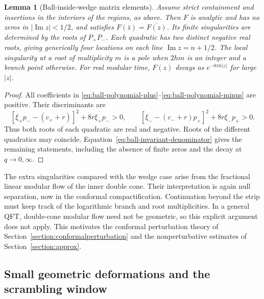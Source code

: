 \documentclass[a4paper,11pt]{article}
\newtheorem{lemma}[theorem]{Lemma}
\theoremstyle{definition}
\begin{document}
\begin{lemma}[Ball-inside-wedge matrix elements]
\label{lem:ball-matrix-element}
Assume strict containment and insertions in the interiors of the regions, as above. Then $F$ is analytic and has no zeros in $|\operatorname{Im}z|<1/2$, and satisfies $F(\bar z)=\overline{F(z)}$. Its finite singularities are determined by the roots of $P_+P_-$. Each quadratic has two distinct negative real roots, giving generically four locations on each line $\operatorname{Im}z=n+1/2$. The local singularity at a root of multiplicity $m$ is a pole when $2hm$ is an integer and a branch point otherwise. For real modular time, $F(z)$ decays as $e^{-8\pi h|z|}$ for large $|z|$.
\end{lemma}
\begin{proof}
All coefficients in \eqref{eq:ball-polynomial-plus}--\eqref{eq:ball-polynomial-minus} are positive. Their discriminants are
\[
 [\xi_+p_--(c_++r)]^2+8r\xi_+p_->0,\qquad [\xi_--(c_-+r)p_+]^2+8r\xi_-p_+>0.
\]
Thus both roots of each quadratic are real and negative. Roots of the different quadratics may coincide. Equation~\eqref{eq:ball-invariant-denominator} gives the remaining statements, including the absence of finite zeros and the decay at $q\to0,\infty$.
\end{proof}

The extra singularities compared with the wedge case arise from the fractional linear modular flow of the inner double cone. Their interpretation is again null separation, now in the conformal compactification. Continuation beyond the strip must keep track of the logarithmic branch and root multiplicities. In a general QFT, double-cone modular flow need not be geometric, so this explicit argument does not apply. This motivates the conformal perturbation theory of Section~\ref{section:conformalperturbation} and the nonperturbative estimates of Section~\ref{section:approx}.

\subsection{Small geometric deformations and the scrambling window}\label{subsec:small-deformations}
\end{document}
